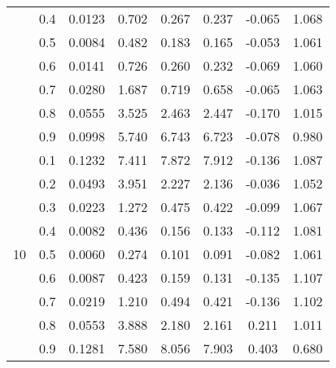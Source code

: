 \documentclass[11pt,a4paper]{report}
\begin{document}
\begin{longtable}{ | c | c || c | c | c | c | c | c | }
 & 0.4 & 0.0123 & 0.702 & 0.267 & 0.237 & -0.065 & 1.068 \\
 & 0.5 & 0.0084 & 0.482 & 0.183 & 0.165 & -0.053 & 1.061 \\
 & 0.6 & 0.0141 & 0.726 & 0.260 & 0.232 & -0.069 & 1.060 \\
 & 0.7 & 0.0280 & 1.687 & 0.719 & 0.658 & -0.065 & 1.063 \\
 & 0.8 & 0.0555 & 3.525 & 2.463 & 2.447 & -0.170 & 1.015 \\
 & 0.9 & 0.0998 & 5.740 & 6.743 & 6.723 & -0.078 & 0.980 \\
 \hline
\multirow{9}{*}{10} & 0.1 & 0.1232 & 7.411 & 7.872 & 7.912 & -0.136 & 1.087 \\
 & 0.2 & 0.0493 & 3.951 & 2.227 & 2.136 & -0.036 & 1.052 \\
 & 0.3 & 0.0223 & 1.272 & 0.475 & 0.422 & -0.099 & 1.067 \\
 & 0.4 & 0.0082 & 0.436 & 0.156 & 0.133 & -0.112 & 1.081 \\
 & 0.5 & 0.0060 & 0.274 & 0.101 & 0.091 & -0.082 & 1.061 \\
 & 0.6 & 0.0087 & 0.423 & 0.159 & 0.131 & -0.135 & 1.107 \\
 & 0.7 & 0.0219 & 1.210 & 0.494 & 0.421 & -0.136 & 1.102 \\
 & 0.8 & 0.0553 & 3.888 & 2.180 & 2.161 & 0.211 & 1.011 \\
 & 0.9 & 0.1281 & 7.580 & 8.056 & 7.903 & 0.403 & 0.680 \\
 \hline
\hline
\end{longtable}
\end{document}
